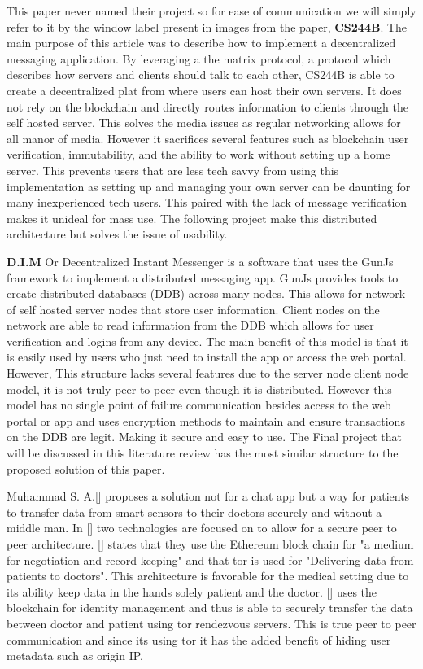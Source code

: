 \documentclass{article}
\begin{document}
This paper never named their project so for ease of communication we will simply refer to it by the window label present in images from the paper, \textbf{CS244B}. 
The main purpose of this article was to describe how to implement a decentralized messaging application. 
By leveraging a the matrix protocol, a protocol which describes how servers and clients should talk to each other, CS244B is able to create a decentralized plat from where users can host their own servers. 
It does not rely on the blockchain and directly routes information to clients through the self hosted server.
This solves the media issues as regular networking allows for all manor of media. 
However it sacrifices several features such as blockchain user verification, immutability, and the ability to work without setting up a home server. 
This prevents users that are less tech savvy from using this implementation as setting up and managing your own server can be daunting for many inexperienced tech users. 
This paired with the lack of message verification makes it unideal for mass use.
The following project make this distributed architecture but solves the issue of usability.

\textbf{D.I.M} Or Decentralized Instant Messenger is a software that uses the GunJs framework to implement a distributed messaging app. 
GunJs provides tools to create distributed databases (DDB) across many nodes. 
This allows for network of self hosted server nodes that store user information. 
Client nodes on the network are able to read information from the DDB which allows for user verification and logins from any device. 
The main benefit of this model is that it is easily used by users who just need to install the app or access the web portal.
However, This structure lacks several features due to the server node client node model, it is not truly peer to peer even though it is distributed. 
However this model has no single point of failure communication besides access to the web portal or app and uses encryption methods to maintain and ensure transactions on the DDB are legit. 
Making it secure and easy to use. 
The Final project that will be discussed in this literature review has the most similar structure to the proposed solution of this paper.

Muhammad S. A.[] proposes a solution not for a chat app but a way for patients to transfer data from smart sensors to their doctors securely and without a middle man. 
In [] two technologies are focused on to allow for a secure peer to peer architecture.
[] states that they use the Ethereum block chain for "a medium for negotiation and record keeping" and that tor is used for "Delivering data from patients to doctors".
This architecture is favorable for the medical setting due to its ability keep data in the hands solely patient and the doctor. 
[] uses the blockchain for identity management and thus is able to securely transfer the data between doctor and patient using tor rendezvous servers.  
This is true peer to peer communication and since its using tor it has the added benefit of hiding user metadata such as origin IP. 
\end{document}
